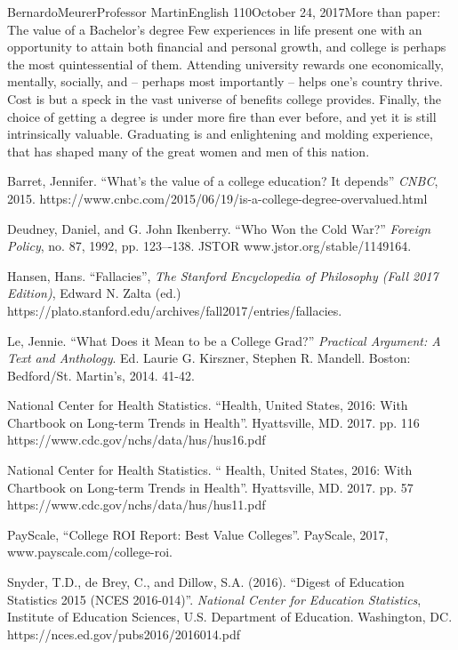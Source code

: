 \documentclass[12pt,letterpaper]{article}
\begin{document}
\begin{mla}{Bernardo}{Meurer}{Professor Martin}{English 110}{October 24, 2017}{More than paper: The value of a Bachelor's degree}
        Few experiences in life present one with an opportunity to attain both financial and personal growth, and college is perhaps the most quintessential of them. Attending university rewards one economically, mentally, socially, and -- perhaps most importantly -- helps one's country thrive. Cost is but a speck in the vast universe of benefits college provides. Finally, the choice of getting a degree is under more fire than ever before, and yet it is still intrinsically valuable. Graduating is and enlightening and molding experience, that has shaped many of the great women and men of this nation.

        \begin{workscited}
        \bibent
        Barret, Jennifer. ``What's the value of a college education? It depends'' \textit{CNBC}, 2015. https://www.cnbc.com/2015/06/19/is-a-college-degree-overvalued.html
    
        \bibent
        Deudney, Daniel, and G. John Ikenberry. ``Who Won the Cold War?'' \textit{Foreign Policy}, no. 87, 1992, pp. 123–-138. JSTOR www.jstor.org/stable/1149164.
    
        \bibent
        Hansen, Hans. ``Fallacies'', \textit{The Stanford Encyclopedia of Philosophy (Fall 2017 Edition)}, Edward N. Zalta (ed.) https://plato.stanford.edu/archives/fall2017/entries/fallacies.
        
        \bibent
        Le, Jennie. ``What Does it Mean to be a College Grad?'' \textit{Practical Argument: A Text and Anthology}. Ed. Laurie G. Kirszner, Stephen R. Mandell. Boston: Bedford/St. Martin’s, 2014. 41-42.
    
        \bibent
        National Center for Health Statistics. ``Health, United States, 2016: With Chartbook on Long-term Trends in Health''. Hyattsville, MD. 2017. pp. 116 https://www.cdc.gov/nchs/data/hus/hus16.pdf
        
        \bibent
        National Center for Health Statistics. `` Health, United States, 2016: With Chartbook on Long-term Trends in Health''. Hyattsville, MD. 2017. pp. 57 https://www.cdc.gov/nchs/data/hus/hus11.pdf
    
        \bibent
        PayScale, ``College ROI Report: Best Value Colleges''. PayScale, 2017, www.payscale.com/college-roi. 
    
        \bibent
        Snyder, T.D., de Brey, C., and Dillow, S.A. (2016). ``Digest of Education Statistics 2015 (NCES 2016-014)''. \textit{National Center for Education Statistics}, Institute of Education Sciences, U.S. Department of Education. Washington, DC. https://nces.ed.gov/pubs2016/2016014.pdf
        
        \end{workscited}
        \end{mla}
        
\end{document}
